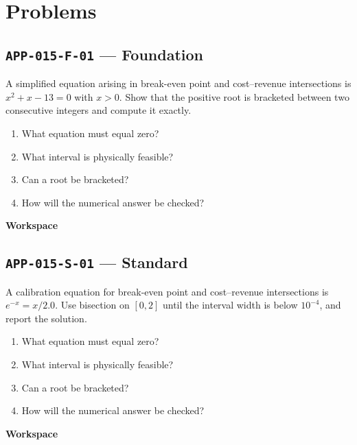 \documentclass[11pt]{book}
\newcommand{\pid}[1]{\texttt{#1}}
\newcommand{\workspace}{\par\vspace{0.7in}\hrulefill\par\vspace{0.55in}\hrulefill\par}
\begin{document}
\section*{Problems}
\subsection*{\pid{APP-015-F-01} — Foundation}
\begin{problembox}
A simplified equation arising in break-even point and cost–revenue intersections is $x^2+x-13=0$ with $x>0$. Show that the positive root is bracketed between two consecutive integers and compute it exactly.
\end{problembox}
\begin{promptbox}\begin{enumerate}
\item What equation must equal zero?
\item What interval is physically feasible?
\item Can a root be bracketed?
\item How will the numerical answer be checked?
\end{enumerate}\end{promptbox}
\textbf{Workspace}\workspace
{}
\subsection*{\pid{APP-015-S-01} — Standard}
\begin{problembox}
A calibration equation for break-even point and cost–revenue intersections is $e^{-x}=x/2.0$. Use bisection on $[0,2]$ until the interval width is below $10^{-4}$, and report the solution.
\end{problembox}
\begin{promptbox}\begin{enumerate}
\item What equation must equal zero?
\item What interval is physically feasible?
\item Can a root be bracketed?
\item How will the numerical answer be checked?
\end{enumerate}\end{promptbox}
\textbf{Workspace}\workspace
{}
\end{document}
